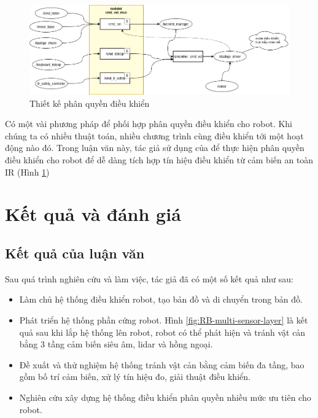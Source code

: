 \begin{figure}[htbp]
    \centering
    \includegraphics[width=\linewidth]{figures/phanquen-dexuat.png}
    \caption{Thiết kế phân quyền điều khiển}
    \label{fig:phanquen-dexuat}
\end{figure}

Có một vài phương pháp để phối hợp phân quyền điều khiển cho robot. Khi chúng ta có nhiều thuật toán, nhiều chương trình cùng điều khiển tới một hoạt động nào đó.
Trong luận văn này, tác giả sử dụng  của  để thực hiện phân quyền điều khiển cho robot để dễ dàng tích hợp tín hiệu điều khiển từ cảm biến an toàn IR (Hình \ref{fig:phanquen-dexuat})

\section{Kết quả và đánh giá}
\label{sec:testbed}


\subsection{Kết quả của luận văn}

Sau quá trình nghiên cứu và làm việc, tác giả đã có một số kết quả như sau:
\begin{itemize}
    \item Làm chủ hệ thống điều khiển robot, tạo bản đồ và di chuyển trong bản đồ.
    \item Phát triển hệ thống phần cứng robot. Hình \ref{fig:RB-multi-sensor-layer} là kết quả sau khi lắp hệ thống lên robot, robot có thể phát hiện và tránh vật cản bằng 3 tầng cảm biến siêu âm, lidar và hồng ngoại.
    \item Đề xuất và thử nghiệm hệ thống tránh vật cản bằng cảm biến đa tầng, bao gồm bố trí cảm biến, xử lý tín hiệu đo, giải thuật điều khiển.
    \item Nghiên cứu xây dựng hệ thống điều khiển phân quyền nhiều mức ưu tiên cho robot.
\end{itemize}

